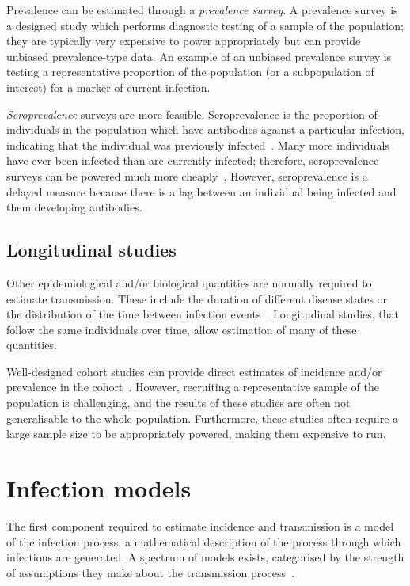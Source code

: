 \documentclass[thesis.tex]{subfiles}
\begin{document}
Prevalence can be estimated through a \emph{prevalence survey}.
A prevalence survey is a designed study which performs diagnostic testing of a sample of the population; they are typically very expensive to power appropriately but can provide unbiased prevalence-type data.
An example of an unbiased prevalence survey is testing a representative proportion of the population (or a subpopulation of interest) for a marker of current infection.

\emph{Seroprevalence} surveys are more feasible.
Seroprevalence is the proportion of individuals in the population which have antibodies against a particular infection, indicating that the individual was previously infected~\autocite{cdcSeroprevalence}.
Many more individuals have ever been infected than are currently infected; therefore, seroprevalence surveys can be powered much more cheaply~\autocite{wuSeroprevSimulation}.
However, seroprevalence is a delayed measure because there is a lag between an individual being infected and them developing antibodies.

\subsection{Longitudinal studies}

Other epidemiological and/or biological quantities are normally required to estimate transmission.
These include the duration of different disease states or the distribution of the time between infection events~\autocite{wallingaGI,dankwaStructural}.
Longitudinal studies, that follow the same individuals over time, allow estimation of many of these quantities.

Well-designed cohort studies can provide direct estimates of incidence and/or prevalence in the cohort~\autocite[chapter 7]{lashModern}.
However, recruiting a representative sample of the population is challenging, and the results of these studies are often not generalisable to the whole population.
Furthermore, these studies often require a large sample size to be appropriately powered, making them expensive to run.

\section{Infection models}

The first component required to estimate incidence and transmission is a model of the infection process, a mathematical description of the process through which infections are generated.
A spectrum of models exists, categorised by the strength of assumptions they make about the transmission process~\autocite{beckerCOVIDmodels}.
\end{document}
